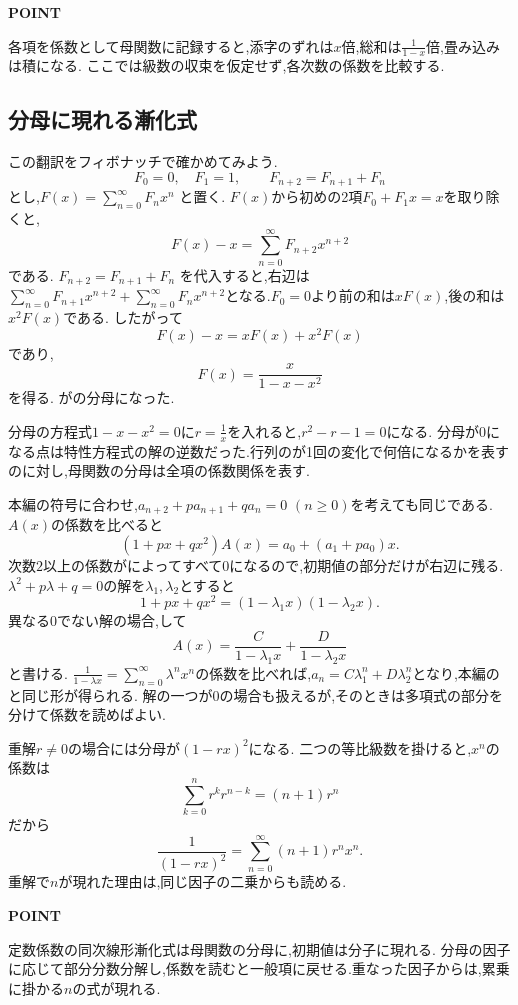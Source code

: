 \begin{bookpoint}
  \textbf{POINT}\par
  各項を係数として母関数に記録すると,添字のずれは$x$倍,総和は$\frac{1}{1-x}$倍,畳み込みは積になる.
  ここでは級数の収束を仮定せず,各次数の係数を比較する.
\end{bookpoint}

\subsection{分母に現れる漸化式}
この翻訳をフィボナッチで確かめてみよう.
\[
  F_0=0,\quad F_1=1,\qquad F_{n+2}=F_{n+1}+F_n
\]
とし,$F(x)=\sum_{n=0}^{\infty}F_nx^n$ と置く.
$F(x)$から初めの2項$F_0+F_1x=x$を取り除くと,
\[
  F(x)-x=\sum_{n=0}^{\infty}F_{n+2}x^{n+2}
\]
である.
 $F_{n+2}=F_{n+1}+F_n$ を代入すると,右辺は$\sum_{n=0}^{\infty}F_{n+1}x^{n+2}+\sum_{n=0}^{\infty}F_nx^{n+2}$となる.$F_0=0$より前の和は$xF(x)$,後の和は$x^2F(x)$である.
したがって
\[
  F(x)-x=xF(x)+x^2F(x)
\]
であり,
\[
  F(x)=\frac{x}{1-x-x^2}
\]
を得る.
がの分母になった.

分母の方程式$1-x-x^2=0$に$r=\frac{1}{x}$を入れると,$r^2-r-1=0$になる.
分母が0になる点は特性方程式の解の逆数だった.行列のが1回の変化で何倍になるかを表すのに対し,母関数の分母は全項の係数関係を表す.

本編の符号に合わせ,$a_{n+2}+pa_{n+1}+qa_n=0$ $(n\ge0)$を考えても同じである.
$A(x)$の係数を比べると
\[
  (1+px+qx^2)A(x)=a_0+(a_1+pa_0)x.
\]
次数$2$以上の係数がによってすべて0になるので,初期値の部分だけが右辺に残る.
$\lambda^2+p\lambda+q=0$の解を$\lambda_1,\lambda_2$とすると
\[
  1+px+qx^2=(1-\lambda_1x)(1-\lambda_2x).
\]
異なる0でない解の場合,して
\[
  A(x)=\frac{C}{1-\lambda_1x}
  +\frac{D}{1-\lambda_2x}
\]
と書ける.
$\frac{1}{1-\lambda x}=\sum_{n=0}^\infty\lambda^n x^n$の係数を比べれば,$a_n=C\lambda_1^n+D\lambda_2^n$となり,本編のと同じ形が得られる.
解の一つが0の場合も扱えるが,そのときは多項式の部分を分けて係数を読めばよい.

重解$r\ne0$の場合には分母が$(1-rx)^2$になる.
二つの等比級数を掛けると,$x^n$の係数は
\[
  \sum_{k=0}^n r^k r^{n-k}=(n+1)r^n
\]
だから
\[
  \frac1{(1-rx)^2}
  =\sum_{n=0}^\infty(n+1)r^n x^n.
\]
重解で$n$が現れた理由は,同じ因子の二乗からも読める.

\begin{bookpoint}
  \textbf{POINT}\par
  定数係数の同次線形漸化式は母関数の分母に,初期値は分子に現れる.
  分母の因子に応じて部分分数分解し,係数を読むと一般項に戻せる.重なった因子からは,累乗に掛かる$n$の式が現れる.
\end{bookpoint}

